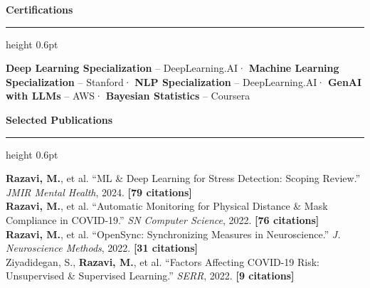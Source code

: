 \documentclass[11pt,letterpaper]{article}
\newcommand{\cvsection}[1]{%
  \vspace{0.2em}%
  {\color{headerblue}\large\bfseries #1}%
  \vspace{0.08em}%
  {\color{goldaccent}\hrule height 0.6pt}%
  \vspace{0.2em}%
}
\begin{document}
\cvsection{Certifications}

{\color{darktext}
\textbf{Deep Learning Specialization} {\color{lightgray}-- DeepLearning.AI}\enspace·\enspace
\textbf{Machine Learning Specialization} {\color{lightgray}-- Stanford}\enspace·\enspace
\textbf{NLP Specialization} {\color{lightgray}-- DeepLearning.AI}\enspace·\enspace
\textbf{GenAI with LLMs} {\color{lightgray}-- AWS}\enspace·\enspace
\textbf{Bayesian Statistics} {\color{lightgray}-- Coursera}
}

\cvsection{Selected Publications}

{\color{darktext}
\textbf{Razavi, M.}, et al. ``ML \& Deep Learning for Stress Detection: Scoping Review.'' \textit{JMIR Mental Health}, 2024. \textbf{[79 citations]}\\[0.05em]
\textbf{Razavi, M.}, et al. ``Automatic Monitoring for Physical Distance \& Mask Compliance in COVID-19.'' \textit{SN Computer Science}, 2022. \textbf{[76 citations]}\\[0.05em]
\textbf{Razavi, M.}, et al. ``OpenSync: Synchronizing Measures in Neuroscience.'' \textit{J. Neuroscience Methods}, 2022. \textbf{[31 citations]}\\[0.05em]
Ziyadidegan, S., \textbf{Razavi, M.}, et al. ``Factors Affecting COVID-19 Risk: Unsupervised \& Supervised Learning.'' \textit{SERR}, 2022. \textbf{[9 citations]}
}
\end{document}
